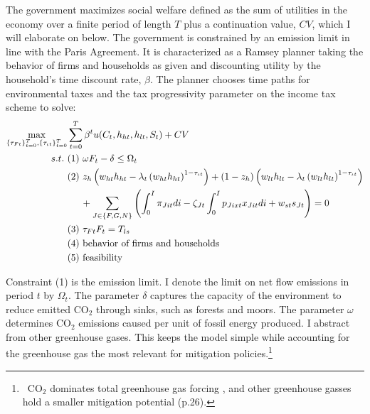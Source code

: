 The government maximizes social welfare defined as the sum of utilities in the economy over a finite period of length $T$ plus a continuation value, $CV$, which I will elaborate on below. The government is constrained by an emission limit in line with the Paris Agreement.  
It is characterized as a Ramsey planner taking the behavior of firms and households as given and discounting utility by the household's time discount rate, $\beta$.
The planner chooses time paths for environmental taxes and the tax progressivity parameter on the income tax scheme to solve:%
\begin{align*}
\underset{\{\tau_{Ft}\}_{t=0}^{T},\{\tau_{\iota t}\}_{t=0}^{T}}{\max}&\sum_{t=0}^{T}\beta^t u(C_{t}, h_{ht}, h_{lt}, S_t)%
+ CV\\
s.t.\ %
& (1)\ \omega F_{t} -\delta \leq \Omega_t %
\\ %
& (2)\ z_h\left(w_{ht}h_{ht}-\lambda_t \left(w_{ht}h_{ht}\right)^{1-\tau_{\iota t}}\right)+(1-z_h)\left(w_{lt}h_{lt}-\lambda_t\left(w_{lt}h_{lt}\right)^{1-\tau_{\iota t}}\right) \\
& \hspace{5mm} +\sum_{J\in\{F,G,N\}}\left(\int_{0}^{I}\pi_{Jit}di-\zeta_{Jt}\int_{0}^{I}p_{Jixt}x_{Jit}di+w_{st}s_{Jt}\right) = 0\\ %
& (3)\ \tau_{Ft}F_{t}=T_{ls}\\
& (4)\ \text{behavior of firms and households}\\
& (5)\ \text{feasibility}
\end{align*}

Constraint (1) is the emission limit. I denote the limit on net flow emissions in period $t$ by $\Omega_t$.  The parameter $\delta$ captures the capacity of the environment to reduce emitted CO$_2$ through sinks, such as forests and moors.  The parameter $\omega$ determines  CO$_2$ emissions caused per unit of fossil energy produced. I abstract from other greenhouse gases. This keeps the model simple while accounting for the greenhouse gas the most relevant for mitigation policies.\footnote{\ CO$_2$ dominates total greenhouse gas forcing \citep[p.29]{IPCC2022}, and other greenhouse gasses hold a smaller mitigation potential (p.26).}

